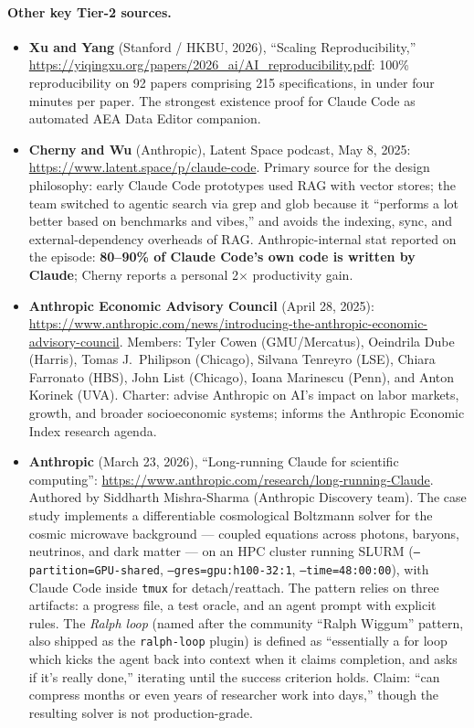 \documentclass[11pt]{article}
\begin{document}
\paragraph{Other key Tier-2 sources.}
\begin{itemize}[leftmargin=*,nosep]
    \item \textbf{Xu and Yang} (Stanford / HKBU, 2026), ``Scaling Reproducibility,'' \url{https://yiqingxu.org/papers/2026_ai/AI_reproducibility.pdf}: 100\% reproducibility on 92 papers comprising 215 specifications, in under four minutes per paper. The strongest existence proof for Claude Code as automated AEA Data Editor companion.
    \item \textbf{Cherny and Wu} (Anthropic), Latent Space podcast, May 8, 2025: \url{https://www.latent.space/p/claude-code}. Primary source for the design philosophy: early Claude Code prototypes used RAG with vector stores; the team switched to agentic search via grep and glob because it ``performs a lot better based on benchmarks and vibes,'' and avoids the indexing, sync, and external-dependency overheads of RAG. Anthropic-internal stat reported on the episode: \textbf{80--90\% of Claude Code's own code is written by Claude}; Cherny reports a personal 2$\times$ productivity gain.
    \item \textbf{Anthropic Economic Advisory Council} (April 28, 2025): \url{https://www.anthropic.com/news/introducing-the-anthropic-economic-advisory-council}. Members: Tyler Cowen (GMU/Mercatus), Oeindrila Dube (Harris), Tomas J.\ Philipson (Chicago), Silvana Tenreyro (LSE), Chiara Farronato (HBS), John List (Chicago), Ioana Marinescu (Penn), and Anton Korinek (UVA). Charter: advise Anthropic on AI's impact on labor markets, growth, and broader socioeconomic systems; informs the Anthropic Economic Index research agenda.
    \item \textbf{Anthropic} (March 23, 2026), ``Long-running Claude for scientific computing'': \url{https://www.anthropic.com/research/long-running-Claude}. Authored by Siddharth Mishra-Sharma (Anthropic Discovery team). The case study implements a differentiable cosmological Boltzmann solver for the cosmic microwave background --- coupled equations across photons, baryons, neutrinos, and dark matter --- on an HPC cluster running SLURM (\texttt{--partition=GPU-shared}, \texttt{--gres=gpu:h100-32:1}, \texttt{--time=48:00:00}), with Claude Code inside \texttt{tmux} for detach/reattach. The pattern relies on three artifacts: a progress file, a test oracle, and an agent prompt with explicit rules. The \emph{Ralph loop} (named after the community ``Ralph Wiggum'' pattern, also shipped as the \texttt{ralph-loop} plugin) is defined as ``essentially a for loop which kicks the agent back into context when it claims completion, and asks if it's really done,'' iterating until the success criterion holds. Claim: ``can compress months or even years of researcher work into days,'' though the resulting solver is not production-grade.

\end{itemize}
\end{document}
